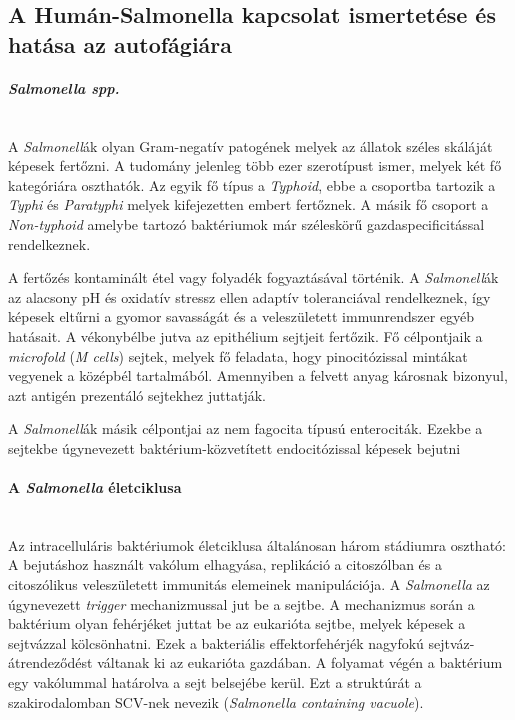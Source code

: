 \documentclass[a4paper,12pt]{article}
\begin{document}
	
	\subsection{A Humán-Salmonella kapcsolat ismertetése és hatása az autofágiára}
	
		\paragraph{\textit{Salmonella spp.}} \mbox{}\\
		A \textit{Salmonell}ák olyan Gram-negatív patogének melyek az állatok széles skáláját képesek fertőzni. A tudomány jelenleg több ezer szerotípust ismer, melyek két fő kategóriára oszthatók. Az egyik fő típus a \textit{Typhoid}, ebbe a csoportba tartozik a \textit{Typhi} és \textit{Paratyphi} melyek kifejezetten embert fertőznek. A másik fő csoport a \textit{Non-typhoid} amelybe tartozó baktériumok már széleskörű gazdaspecificitással rendelkeznek. \cite{salmonella_and_host_cell_nature}
		
		A fertőzés kontaminált étel vagy folyadék fogyaztásával történik. A \textit{Salmonell}ák az alacsony pH és oxidatív stressz ellen adaptív toleranciával rendelkeznek, így képesek eltűrni a gyomor savasságát és a veleszületett immunrendszer egyéb hatásait. A vékonybélbe jutva az epithélium sejtjeit fertőzik. Fő célpontjaik a \textit{microfold} (\textit{M cells}) sejtek, melyek fő feladata, hogy pinocitózissal mintákat vegyenek a középbél tartalmából. Amennyiben a felvett anyag károsnak bizonyul, azt antigén prezentáló sejtekhez juttatják. \cite{salmonella_and_host_cell_nature}
		
		A \textit{Salmonell}ák másik célpontjai az nem fagocita típusú enterociták. Ezekbe a sejtekbe úgynevezett baktérium-közvetített endocitózissal képesek bejutni \cite{salmonella_and_host_cell_nature}
		
		
		\paragraph{A \textit{Salmonella} életciklusa} \mbox{}\\
		Az intracelluláris baktériumok életciklusa általánosan három stádiumra osztható: A bejutáshoz használt vakólum elhagyása, replikáció a citoszólban és a citoszólikus veleszületett immunitás elemeinek manipulációja. A \textit{Salmonella} az úgynevezett \textit{trigger} mechanizmussal jut be a sejtbe. A mechanizmus során a baktérium olyan fehérjéket juttat be az eukarióta sejtbe, melyek képesek a sejtvázzal kölcsönhatni. Ezek a bakteriális effektorfehérjék nagyfokú sejtváz-átrendeződést váltanak ki az eukarióta gazdában. A folyamat végén a baktérium egy vakólummal határolva a sejt belsejébe kerül. \cite{salmonella_autophagy_nature_old} Ezt a struktúrát a szakirodalomban SCV-nek nevezik (\textit{Salmonella containing vacuole}). \cite{salmonella_and_host_cell_nature}
		
\end{document}
